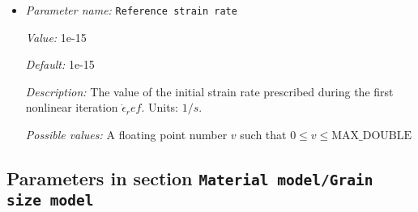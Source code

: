 \begin{itemize}
{\it Value:} 1e19


{\it Default:} 1e19


{\it Description:} The value of the minimum viscosity cutoff $\eta_min$. Units: $Pa\;s$.


{\it Possible values:} A floating point number $v$ such that $0 \leq v \leq \text{MAX\_DOUBLE}$
\item {\it Parameter name:} {\tt Reference strain rate}
\label{parameters:Material model/Dynamic Friction/Viscosities/Reference strain rate}
\label{parameters:Material_20model/Dynamic_20Friction/Viscosities/Reference_20strain_20rate}


{\it Value:} 1e-15


{\it Default:} 1e-15


{\it Description:} The value of the initial strain rate prescribed during the first nonlinear iteration $\dot{\epsilon}_ref$. Units: $1/s$.


{\it Possible values:} A floating point number $v$ such that $0 \leq v \leq \text{MAX\_DOUBLE}$
\end{itemize}

\subsection{Parameters in section \tt Material model/Grain size model}
\label{parameters:Material_20model/Grain_20size_20model}

